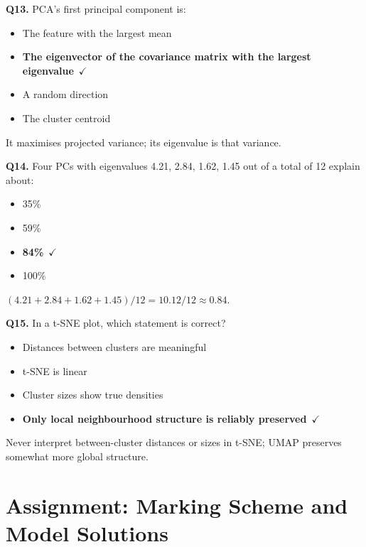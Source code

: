 \documentclass[11pt]{article}
\begin{document}
{\noindent\textbf{Q13.} PCA's first principal component is:\begin{itemize}[leftmargin=2.2em,itemsep=0pt,topsep=1pt]\item[A.] The feature with the largest mean\item[\textbf{B.}] \textbf{The eigenvector of the covariance matrix with the largest eigenvalue}~{\color{GrnN}$\checkmark$}\item[C.] A random direction\item[D.] The cluster centroid\end{itemize} It maximises projected variance; its eigenvalue is that variance.\par\medskip

\noindent\textbf{Q14.} Four PCs with eigenvalues 4.21, 2.84, 1.62, 1.45 out of a total of 12 explain about:\begin{itemize}[leftmargin=2.2em,itemsep=0pt,topsep=1pt]\item[A.] 35\%\item[B.] 59\%\item[\textbf{C.}] \textbf{84\%}~{\color{GrnN}$\checkmark$}\item[D.] 100\%\end{itemize} $(4.21+2.84+1.62+1.45)/12=10.12/12\approx0.84$.\par\medskip

\noindent\textbf{Q15.} In a t-SNE plot, which statement is correct?\begin{itemize}[leftmargin=2.2em,itemsep=0pt,topsep=1pt]\item[A.] Distances between clusters are meaningful\item[B.] t-SNE is linear\item[C.] Cluster sizes show true densities\item[\textbf{D.}] \textbf{Only local neighbourhood structure is reliably preserved}~{\color{GrnN}$\checkmark$}\end{itemize} Never interpret between-cluster distances or sizes in t-SNE; UMAP preserves somewhat more global structure.\par\medskip

}

\section{Assignment: Marking Scheme and Model Solutions}
\end{document}
